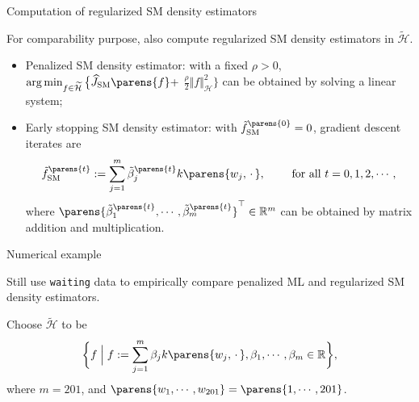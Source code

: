 \documentclass[aspectratio=169,xcolor=dvipsnames]{beamer}
\DeclareMathOperator*{\argmin}{arg\,min}
\newcommand{\SM}{\mathrm{SM}}
\newcommand{\calH}{\mathcal{H}}
\begin{document}
\begin{frame}{Computation of regularized SM density estimators}
	
	For comparability purpose, also compute regularized SM density estimators in $\widetilde{\calH}$. 
	
	\vspace{5pt}
	
	\begin{itemize}
		\item Penalized SM density estimator: with a fixed $\rho > 0$, $\argmin_{f \in \widetilde{\calH}} \big\{\widehat{J}_{\SM} \parens{f} + $ $ \frac{\rho}{2} \Vert f \Vert_{\mathcal{H}}^2 \big\}$ can be obtained by solving a linear system; %
		
		\vspace{5pt}
		
		\item Early stopping SM density estimator:
		with $\tilde{f}_{\SM}^{\parens{0}} = 0$, gradient descent iterates are 
		\begin{align*}
			\tilde{f}_{\SM}^{\parens{t}} := \sum_{j=1}^m \tilde{\beta}_j^{\parens{t}} k \parens{w_j, \,\cdot\,}, \qquad \text{ for all } t = 0, 1, 2, \cdots, 
		\end{align*}
		where $\parens{\tilde{\beta}_1^{\parens{t}}, \cdots, \tilde{\beta}_m^{\parens{t}}}^\top \in \mathbb{R}^m$ can be obtained by matrix addition and multiplication. %
	\end{itemize}
	
\end{frame}


\begin{frame}{Numerical example}
	
	Still use \texttt{waiting} data to empirically compare penalized ML and regularized SM density estimators. 
	
	\vspace{5pt}
	
	Choose $\widetilde{\calH}$ to be 
	\begin{align}
		\bigg\{ f \Bigm| f := \sum_{j=1}^m \beta_j k \parens{w_j, \,\cdot\,}, \beta_1, \cdots, \beta_m \in \mathbb{R} \bigg\}, 
	\end{align}
	where $m = 201$, and $\parens{w_1, \cdots, w_{201}} = \parens{1, \cdots, 201}$. 
		
\end{frame}
\end{document}
